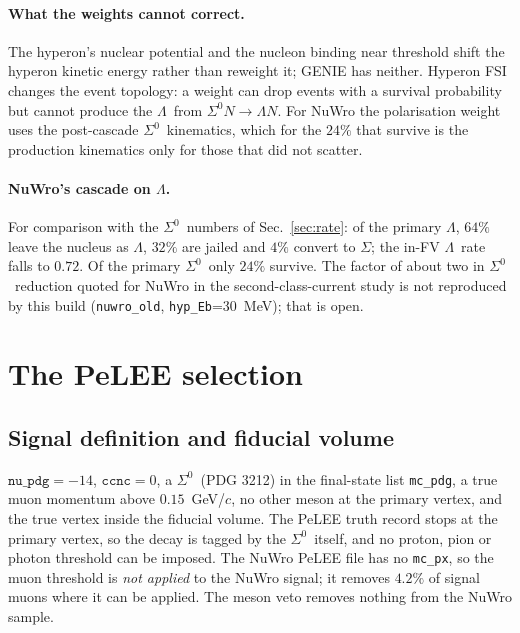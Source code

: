 \documentclass[11pt,a4paper]{article}
\newcommand{\Szero}{\ensuremath{\Sigma^{0}}}
\newcommand{\Lam}{\ensuremath{\Lambda}}
\begin{document}
\paragraph{What the weights cannot correct.} The hyperon's nuclear potential and the
nucleon binding near threshold shift the hyperon kinetic energy rather than reweight
it; GENIE has neither. Hyperon FSI changes the event topology: a weight can drop
events with a survival probability but cannot produce the \Lam\ from $\Szero N\to\Lam
N$. For NuWro the polarisation weight uses the post-cascade \Szero\ kinematics, which
for the $24\%$ that survive is the production kinematics only for those that did not
scatter.

\paragraph{NuWro's cascade on \Lam.} For comparison with the \Szero\ numbers of
Sec.~\ref{sec:rate}: of the primary \Lam, $64\%$ leave the nucleus as \Lam, $32\%$ are
jailed and $4\%$ convert to $\Sigma$; the in-FV \Lam\ rate falls to $0.72$. Of the
primary \Szero\ only $24\%$ survive. The factor of about two in \Szero\ reduction quoted
for NuWro in the second-class-current study is not reproduced by this build
(\texttt{nuwro\_old}, \texttt{hyp\_Eb}=30~MeV); that is open.

\section{The PeLEE selection}
\label{sec:pelee}

\subsection{Signal definition and fiducial volume}
$\texttt{nu\_pdg} = -14$, $\texttt{ccnc} = 0$, a \Szero\ (PDG 3212) in the
final-state list \texttt{mc\_pdg}, a true muon momentum above $0.15$~GeV/$c$, no
other meson at the primary vertex, and the true vertex inside the fiducial volume.
The PeLEE truth record stops at the primary vertex, so the decay is tagged by the
\Szero\ itself, and no proton, pion or photon threshold can be imposed. The NuWro
PeLEE file has no \texttt{mc\_px}, so the muon threshold is \emph{not applied} to
the NuWro signal; it removes $4.2\%$ of signal muons where it can be applied. The
meson veto removes nothing from the NuWro sample.
\end{document}
